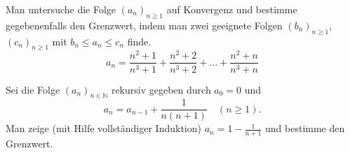 \documentclass[a4paper, 12pt, margins=3cm]{homework}
\newcommand{\N}{\mathbb{N}}
\begin{document}
  \begin{problem}
    Man untersuche die Folge $(a_n)_{n\geq 1}$ auf Konvergenz und bestimme gegebenenfalls
    den Grenzwert, indem man zwei geeignete Folgen $(b_n)_{n\geq 1}$, $(c_n)_{n\geq 1}$
    mit $b_n\leq a_n\leq c_n$ finde.
    \[ a_n = \frac{n^2+1}{n^3+1}+\frac{n^2+2}{n^3+2}+...+\frac{n^2+n}{n^3+n} \]
  \end{problem}
  \begin{solution}
    
  \end{solution}

  \begin{problem}
    Sei die Folge $(a_n)_{n\in\N}$ rekursiv gegeben durch $a_0=0$ und
    \[ a_n = a_{n-1} + \frac{1}{n(n+1)}\quad (n\geq 1). \]
    Man zeige (mit Hilfe vollständiger Induktion) $a_n = 1-\frac{1}{n+1}$ und bestimme
    den Grenzwert.
  \end{problem}
  \begin{solution}
    
  \end{solution}
\end{document}
